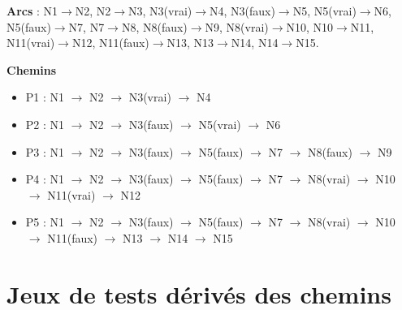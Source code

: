 \documentclass[11pt,a4paper]{article}
\begin{document}
\textbf{Arcs} : N1$\rightarrow$N2, N2$\rightarrow$N3, N3(vrai)$\rightarrow$N4, N3(faux)$\rightarrow$N5, N5(vrai)$\rightarrow$N6, N5(faux)$\rightarrow$N7, N7$\rightarrow$N8, N8(faux)$\rightarrow$N9, N8(vrai)$\rightarrow$N10, N10$\rightarrow$N11, N11(vrai)$\rightarrow$N12, N11(faux)$\rightarrow$N13, N13$\rightarrow$N14, N14$\rightarrow$N15.

\textbf{Chemins}
\begin{itemize}[leftmargin=1cm]
    \item P1 : N1 $\rightarrow$ N2 $\rightarrow$ N3(vrai) $\rightarrow$ N4
    \item P2 : N1 $\rightarrow$ N2 $\rightarrow$ N3(faux) $\rightarrow$ N5(vrai) $\rightarrow$ N6
    \item P3 : N1 $\rightarrow$ N2 $\rightarrow$ N3(faux) $\rightarrow$ N5(faux) $\rightarrow$ N7 $\rightarrow$ N8(faux) $\rightarrow$ N9
    \item P4 : N1 $\rightarrow$ N2 $\rightarrow$ N3(faux) $\rightarrow$ N5(faux) $\rightarrow$ N7 $\rightarrow$ N8(vrai) $\rightarrow$ N10 $\rightarrow$ N11(vrai) $\rightarrow$ N12
    \item P5 : N1 $\rightarrow$ N2 $\rightarrow$ N3(faux) $\rightarrow$ N5(faux) $\rightarrow$ N7 $\rightarrow$ N8(vrai) $\rightarrow$ N10 $\rightarrow$ N11(faux) $\rightarrow$ N13 $\rightarrow$ N14 $\rightarrow$ N15
\end{itemize}

\section{Jeux de tests dérivés des chemins}
\end{document}
